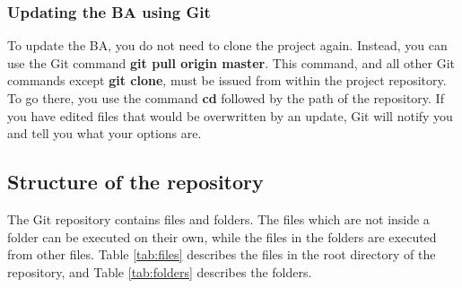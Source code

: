 \documentclass[a4paper, oneside, onecolumn, 11pt]{article}
\newcommand{\file}[1]{\emph{#1}}
\newcommand{\command}[1]{\textbf{#1}}
\begin{document}
\subsubsection{Updating the BA using Git}
\label{sec:pull}
To update the BA, you do not need to clone the project again. Instead, you can use the Git command \command{git pull origin master}. This command, and all other Git commands except \command{git clone}, must be issued from within the project repository. To go there, you use the command \command{cd} followed by the path of the repository. If you have edited files that would be overwritten by an update, Git will notify you and tell you what your options are.

\subsection{Structure of the repository}
The Git repository contains files and folders. The files which are not inside a folder can be executed on their own, while the files in the folders are executed from other files. Table \ref{tab:files} describes the files in the root directory of the repository, and Table \ref{tab:folders} describes the folders.

\end{document}
